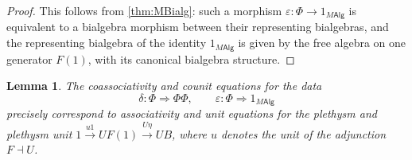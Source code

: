 \documentclass[12pt,reqno]{amsart}
\theoremstyle{plain}
\newtheorem{lem}[thm]{Lemma}
\theoremstyle{definition}
\theoremstyle{remark}
\newcommand{\maps}{\colon}
\newcommand{\To}{\Rightarrow}
\newcommand{\namedcat}[1]{\mathsf{#1}}
\newcommand{\Alg}{\namedcat{Alg}}
\numberwithin{thm}{section}
\begin{document}
\begin{proof}
    This follows from \cref{thm:MBialg}: such a morphism $\varepsilon \maps \Phi \to 1_{M\Alg}$ is equivalent to a bialgebra morphism between their representing bialgebras, and the representing bialgebra of the identity $1_{M\Alg}$ is given by the free algebra on one generator $F(1)$, with its canonical bialgebra structure.
\end{proof}

\begin{lem}
\label{lem:M-plethory_coassociativity}
    The coassociativity and counit equations for the data 
    \[
    \delta \maps \Phi \To \Phi\Phi, \qquad \varepsilon \maps \Phi \To 1_{M\Alg}
    \]
    precisely correspond to associativity and unit equations for the plethysm and plethysm unit $1 \xrightarrow{u1} UF(1) \xrightarrow{U\eta} UB$, where $u$ denotes the unit of the adjunction $F \dashv U$. 
\end{lem}
\end{document}
